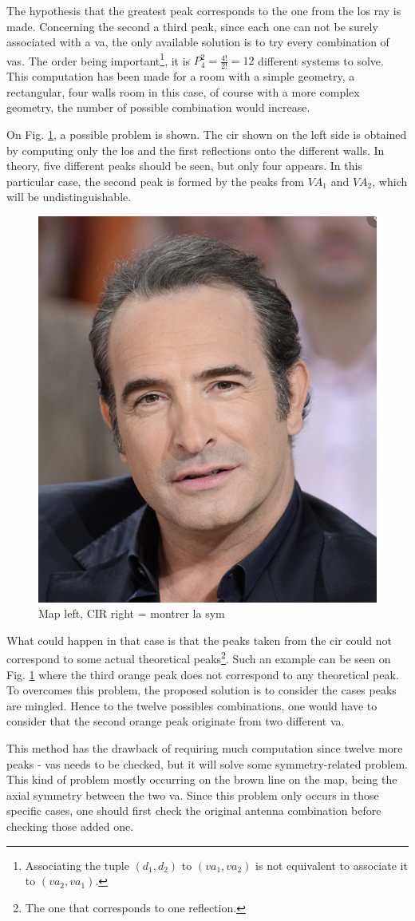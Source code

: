 The hypothesis that the greatest peak corresponds to the one from the \gls{los} ray is made. Concerning the second a third peak, since each one can not be surely associated with a \gls{va}, the only available solution is to try every combination of \glspl{va}. The order being important\footnote{Associating the tuple $(d_1, d_2)$ to $(va_1, va_2)$ is not equivalent to associate it to $(va_2, va_1)$.}, it is $P^2_4 = \frac{4!}{2!} = 12$ different systems to solve. This computation has been made for a room with a simple geometry, a rectangular, four walls room in this case, of course with a more complex geometry, the number of possible combination would increase.
\vspace{2mm}

On Fig. \ref{fig:va_sym}, a possible problem is shown. The \gls{cir} shown on the left side is obtained by computing only the \gls{los} and the first reflections onto the different walls. In theory, five different peaks should be seen, but only four appears. In this particular case, the second peak is formed by the peaks from $VA_1$ and $VA_2$, which will be undistinguishable.

\begin{figure}[H]
\centering
\includegraphics[width=.2\linewidth]{Images/Temporary_pic.png}
\caption{Map left, CIR right = montrer la sym \label{fig:va_sym}}
\end{figure}

What could happen in that case is that the peaks taken from the \gls{cir} could not correspond to some actual theoretical peaks\footnote{The one that corresponds to one reflection. }. Such an example can be seen on Fig. \ref{fig:va_sym} where the third orange peak does not correspond to any theoretical peak. To overcomes this problem, the proposed solution is to consider the cases peaks are mingled. Hence to the twelve possibles combinations, one would have to consider that the second orange peak originate from two different \gls{va}.
\vspace{2mm}

This method has the drawback of requiring much computation since twelve more peaks - \glspl{va} needs to be checked, but it will solve some symmetry-related problem. This kind of problem mostly occurring on the brown line on the map, being the axial symmetry between the two \gls{va}. Since this problem only occurs in those specific cases, one should first check the original antenna combination before checking those added one.
\vspace{2mm}

